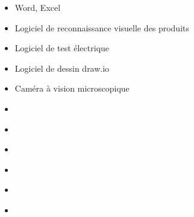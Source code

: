 \documentclass{article}
\begin{document}
\begin{tabular}
\begin{itemize}
        \begin{itemize}
        [label={\textcolor{gray!80}{\checkmark}}, topsep=8pt, partopsep=0pt, itemsep=0.5pt, parsep=2pt,after=\vspace*{-\baselineskip}] 
            \item \textcolor{gray!80}{Word, Excel}
            \item \textcolor{gray!80}{Logiciel de reconnaissance visuelle des produits}
            \item \textcolor{gray!80}{Logiciel de test électrique}
            \item \textcolor{gray!80}{Logiciel de dessin draw.io}
            \item \textcolor{gray!80}{Caméra à vision microscopique}
            \item[\textcolor{white}{\checkmark}] \textcolor{gray!80}{} %
            \item[\textcolor{white}{\checkmark}] \textcolor{gray!80}{} %
            \item[\textcolor{white}{\checkmark}] \textcolor{gray!80}{} %
            \item[\textcolor{white}{\checkmark}] \textcolor{gray!80}{} %
            \item[\textcolor{white}{\checkmark}] \textcolor{gray!80}{} %
            \item[\textcolor{white}{\checkmark}] \textcolor{gray!80}{} %



        \end{itemize}
    \end{itemize}
\end{tabular}

\vfill %
\end{document}
